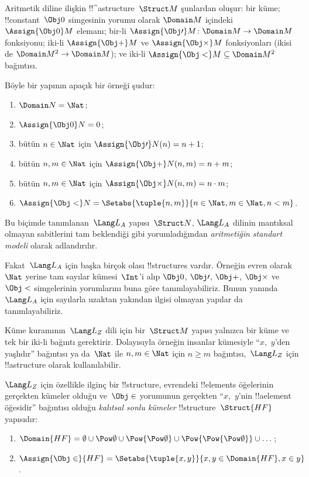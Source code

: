 \documentclass[../../../include/open-logic-section]{subfiles}
\begin{document}
\begin{ex}
Aritmetik diline ilişkin !!^a{structure}~$\Struct M$ şunlardan oluşur:
bir küme; !!{constant}~$\Obj0$ simgesinin yorumu olarak
$\Domain M$ içindeki $\Assign{\Obj0}M$ elemanı; bir-li
$\Assign{\Obj\prime}M\colon\Domain M\to\Domain M$ fonksiyonu;
iki-li $\Assign{\Obj+}M$ ve $\Assign{\Obj\times}M$ fonksiyonları
(ikisi de $\Domain M^2\to\Domain M$); ve iki-li
$\Assign{\Obj<}M\subseteq\Domain M^2$ bağıntısı.

Böyle bir yapının apaçık bir örneği şudur:
\begin{enumerate}
\item $\Domain N=\Nat$;
\item $\Assign{\Obj0}N=0$;
\item bütün $n\in\Nat$ için $\Assign{\Obj\prime}N(n)=n+1$;
\item bütün $n,m\in\Nat$ için $\Assign{\Obj+}N(n,m)=n+m$;
\item bütün $n,m\in\Nat$ için $\Assign{\Obj\times}N(n,m)=n\cdot m$;
\item $\Assign{\Obj<}N=\Setabs{\tuple{n,m}}{n\in\Nat,m\in\Nat,n<m}$.
\end{enumerate}
Bu biçimde tanımlanan~$\Lang L_A$ yapısı~$\Struct N$,
$\Lang L_A$ dilinin mantıksal olmayan sabitlerini tam beklendiği gibi
yorumladığından \emph{aritmetiğin standart modeli} olarak adlandırılır.

Fakat~$\Lang L_A$ için başka birçok olası !!{structure}s vardır.
Örneğin evren olarak~$\Nat$ yerine tam sayılar kümesi~$\Int$'i alıp
$\Obj0$, $\Obj\prime$, $\Obj+$, $\Obj\times$ ve $\Obj<$ simgelerinin
yorumlarını buna göre tanımlayabiliriz. Bunun yanında~$\Lang L_A$ için
sayılarla uzaktan yakından ilgisi olmayan yapılar da tanımlayabiliriz.
\end{ex}

\begin{ex}
Küme kuramının~$\Lang L_Z$ dili için bir~$\Struct M$ yapısı yalnızca
bir küme ve tek bir iki-li bağıntı gerektirir. Dolayısıyla örneğin
insanlar kümesiyle ``$x$,~$y$'den yaşlıdır'' bağıntısı ya da~$\Nat$
ile $n,m\in\Nat$ için $n\geq m$ bağıntısı,~$\Lang L_Z$ için
!!a{structure} olarak kullanılabilir.

$\Lang L_Z$ için özellikle ilginç bir !!{structure}, evrendeki
!!{element}s öğelerinin gerçekten kümeler olduğu ve~$\Obj\in$
yorumunun gerçekten ``$x$,~$y$'nin !!a{element} öğesidir'' bağıntısı
olduğu \emph{kalıtsal sonlu kümeler} !!{structure}~$\Struct{{HF}}$
yapısıdır:
\begin{enumerate}
\item $\Domain{{HF}}=\emptyset\cup\Pow\emptyset\cup
  \Pow{\Pow\emptyset}\cup\Pow{\Pow{\Pow\emptyset}}\cup\dots$;
\item $\Assign{\Obj\in}{{HF}}=
  \Setabs{\tuple{x,y}}{x,y\in\Domain{{HF}},x\in y}$.
\end{enumerate}
\end{ex}
\end{document}
